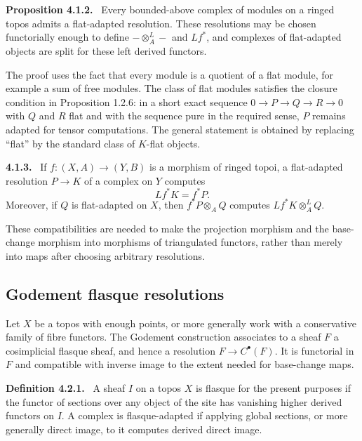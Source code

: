 \documentclass[12pt]{article}
\newenvironment{statement}[1]{\par\medskip\noindent\textbf{#1.}\ }{\par\medskip}
\begin{document}
\begin{statement}{Proposition 4.1.2}
Every bounded-above complex of modules on a ringed topos admits a flat-adapted resolution. These resolutions may be chosen functorially enough to define \(-\otimes_A^L-\) and \(Lf^*\), and complexes of flat-adapted objects are split for these left derived functors.
\end{statement}

The proof uses the fact that every module is a quotient of a flat module, for example a sum of free modules. The class of flat modules satisfies the closure condition in Proposition 1.2.6: in a short exact sequence \(0\to P\to Q\to R\to0\) with \(Q\) and \(R\) flat and with the sequence pure in the required sense, \(P\) remains adapted for tensor computations. The general statement is obtained by replacing ``flat'' by the standard class of \(K\)-flat objects.

\begin{statement}{4.1.3}
If \(f:(X,A)\to(Y,B)\) is a morphism of ringed topoi, a flat-adapted resolution \(P\to K\) of a complex on \(Y\) computes
\[
Lf^*K=f^*P.
\]
Moreover, if \(Q\) is flat-adapted on \(X\), then \(f^*P\otimes_A Q\) computes \(Lf^*K\otimes_A^L Q\).
\end{statement}

These compatibilities are needed to make the projection morphism and the base-change morphism into morphisms of triangulated functors, rather than merely into maps after choosing arbitrary resolutions.

\subsection{Godement flasque resolutions}

Let \(X\) be a topos with enough points, or more generally work with a conservative family of fibre functors. The Godement construction associates to a sheaf \(F\) a cosimplicial flasque sheaf, and hence a resolution \(F\to C^\bullet(F)\). It is functorial in \(F\) and compatible with inverse image to the extent needed for base-change maps.

\begin{statement}{Definition 4.2.1}
A sheaf \(I\) on a topos \(X\) is flasque for the present purposes if the functor of sections over any object of the site has vanishing higher derived functors on \(I\). A complex is flasque-adapted if applying global sections, or more generally direct image, to it computes derived direct image.
\end{statement}
\end{document}

